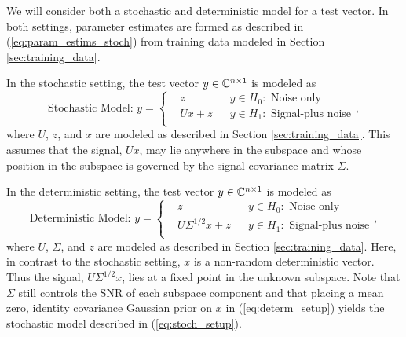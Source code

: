 We will consider both a stochastic and deterministic model for a test vector. In both settings, parameter estimates are formed as described in (\ref{eq:param_estims_stoch}) from training data modeled in Section \ref{sec:training_data}.

In the stochastic setting, the test vector $y\in\mathbb{C}^{n\times 1}$ is modeled as
\small\begin{equation}\label{eq:stoch_setup}
\text{Stochastic Model: }y=\left\{
\begin{aligned}
&z
&& y\in H_0:\text{ Noise only}\\
&Ux+z
&& y\in H_1:\text{ Signal-plus noise}\\
\end{aligned}\right. ,
\end{equation}\normalsize
where $U$, $z$, and $x$ are modeled as described in Section \ref{sec:training_data}. This assumes that the signal, $Ux$, may lie anywhere in the subspace and whose position in the subspace is governed by the signal covariance matrix $\Sigma$.

In the deterministic setting, the test vector $y\in\mathbb{C}^{n\times 1}$ is modeled as
\small\begin{equation}\label{eq:determ_setup}
\text{Deterministic Model: }y=\left\{
\begin{aligned}
&z
&& y\in H_0:\text{ Noise only}\\
&U\Sigma^{1/2} x+z
&& y\in H_1:\text{ Signal-plus noise}\\
\end{aligned}\right. ,
\end{equation}\normalsize
where $U$, $\Sigma$, and $z$ are modeled as described in Section \ref{sec:training_data}. Here, in contrast to the stochastic setting, $x$ is a non-random deterministic vector. Thus the signal, $U\Sigma^{1/2}x$, lies at a fixed point in the unknown subspace. Note that $\Sigma$ still controls the SNR of each subspace component and that placing a mean zero, identity covariance Gaussian prior on $x$ in (\ref{eq:determ_setup}) yields the stochastic model described in (\ref{eq:stoch_setup}).
